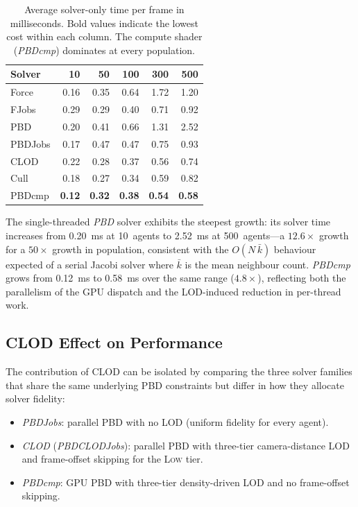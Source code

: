 \begin{table}[h]
\centering
\small
\begin{tabular}{lrrrrr}
\hline
\textbf{Solver} & \textbf{10} & \textbf{50} & \textbf{100} & \textbf{300} & \textbf{500} \\
\hline
Force         & 0.16 & 0.35 & 0.64 & 1.72 & 1.20 \\
FJobs         & 0.29 & 0.29 & 0.40 & 0.71 & 0.92 \\
PBD           & 0.20 & 0.41 & 0.66 & 1.31 & 2.52 \\
PBDJobs       & 0.17 & 0.47 & 0.47 & 0.75 & 0.93 \\
CLOD          & 0.22 & 0.28 & 0.37 & 0.56 & 0.74 \\
Cull          & 0.18 & 0.27 & 0.34 & 0.59 & 0.82 \\
PBDcmp        & \textbf{0.12} & \textbf{0.32} & \textbf{0.38} & \textbf{0.54} & \textbf{0.58} \\
\hline
\end{tabular}
\caption{Average solver-only time per frame in milliseconds.  Bold
values indicate the lowest cost within each column.  The compute
shader (\textit{PBDcmp}) dominates at every population.}
\label{tab:solver_ms_summary}
\end{table}

The single-threaded \textit{PBD} solver exhibits the steepest growth:
its solver time increases from 0.20~ms at 10~agents to 2.52~ms at
500~agents---a $12.6\times$ growth for a $50\times$ growth in
population, consistent with the $O(N\,\bar{k})$ behaviour expected of
a serial Jacobi solver where $\bar{k}$ is the mean neighbour count.
\textit{PBDcmp} grows from 0.12~ms to 0.58~ms over the same range
($4.8\times$), reflecting both the parallelism of the GPU dispatch and
the LOD-induced reduction in per-thread work.

\subsection{CLOD Effect on Performance}
\label{sec:results_clod}

The contribution of CLOD can be isolated by comparing the three solver
families that share the same underlying PBD constraints but differ in
how they allocate solver fidelity:

\begin{itemize}[topsep=2pt,itemsep=2pt]
    \item \textit{PBDJobs}: parallel PBD with no LOD (uniform
    fidelity for every agent).
    \item \textit{CLOD} (\textit{PBDCLODJobs}): parallel PBD with
    three-tier camera-distance LOD and frame-offset skipping for the
    \textsc{Low} tier.
    \item \textit{PBDcmp}: GPU PBD with three-tier density-driven LOD
    and no frame-offset skipping.
\end{itemize}


